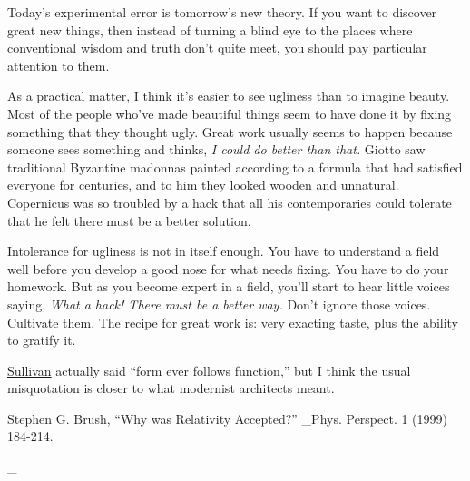 Today's experimental error is tomorrow's new theory. If you want to
discover great new things, then instead of turning a blind eye to the
places where conventional wisdom and truth don't quite meet, you should
pay particular attention to them.

As a practical matter, I think it's easier to see ugliness than to
imagine beauty. Most of the people who've made beautiful things seem to
have done it by fixing something that they thought ugly. Great work
usually seems to happen because someone sees something and thinks,
\emph{I could do better than that.} Giotto saw traditional Byzantine
madonnas painted according to a formula that had satisfied everyone for
centuries, and to him they looked wooden and unnatural. Copernicus was
so troubled by a hack that all his contemporaries could tolerate that he
felt there must be a better solution.

Intolerance for ugliness is not in itself enough. You have to understand
a field well before you develop a good nose for what needs fixing. You
have to do your homework. But as you become expert in a field, you'll
start to hear little voices saying, \emph{What a hack! There must be a
better way.} Don't ignore those voices. Cultivate them. The recipe for
great work is: very exacting taste, plus the ability to gratify it.


\href{https://sep.turbifycdn.com/ty/cdn/paulgraham/sullivan.html?t=1688221954&}{Sullivan}
actually said ``form ever follows function,'' but I think the usual
misquotation is closer to what modernist architects meant.

Stephen G. Brush, ``Why was Relativity Accepted?'' \_Phys. Perspect. 1
(1999) 184-214.

\_